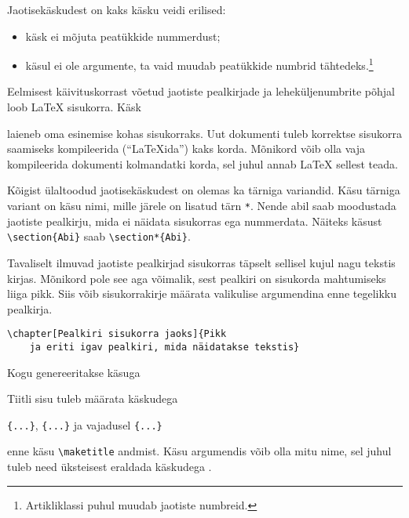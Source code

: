 Jaotisekäskudest on kaks käsku veidi erilised:
\begin{itemize}
\item käsk  ei mõjuta peatükkide nummerdust;
\item käsul  ei ole argumente, ta vaid muudab
peatükkide numbrid tähtedeks.\footnote{Artikliklassi puhul muudab
jaotiste numbreid.}
\end{itemize}

Eelmisest käivituskorrast võetud jaotiste pealkirjade ja
leheküljenumbrite põhjal loob \LaTeX{} sisukorra. Käsk
\begin{lscommand}
\end{lscommand}
\noindent laieneb oma esinemise kohas sisukorraks. Uut dokumenti tuleb
korrektse sisukorra saamiseks kompileerida ("`\LaTeX ida"') kaks korda.
Mõnikord võib olla vaja kompileerida dokumenti kolmandatki korda, sel
juhul annab \LaTeX{} sellest teada.

Kõigist ülaltoodud jaotisekäskudest on olemas ka tärniga variandid. Käsu
tärniga variant on käsu nimi, mille järele on lisatud tärn
\verb|*|.
Nende abil saab moodustada jaotiste pealkirju, mida ei näidata
sisukorras ega nummerdata. Näiteks käsust \verb|\section{Abi}| saab
\verb|\section*{Abi}|.

Tavaliselt ilmuvad jaotiste pealkirjad sisukorras täpselt sellisel kujul
nagu tekstis kirjas. Mõnikord pole see aga võimalik, sest pealkiri on
sisukorda mahtumiseks liiga pikk. Siis võib sisukorrakirje määrata
valikulise argumendina enne tegelikku pealkirja.

\begin{code}
\verb|\chapter[Pealkiri sisukorra jaoks]{Pikk|\\
\verb|    ja eriti igav pealkiri, mida näidatakse tekstis}|
\end{code}

Kogu  genereeritakse käsuga
\begin{lscommand}
\end{lscommand}
\noindent Tiitli sisu tuleb määrata käskudega
\begin{lscommand}
\verb|{...}|, \verb|{...}|
ja vajadusel \verb|{...}|
\end{lscommand}
\noindent enne käsu \verb|\maketitle| andmist. Käsu 
argumendis võib olla mitu nime, sel juhul tuleb need üksteisest eraldada
käskudega .

